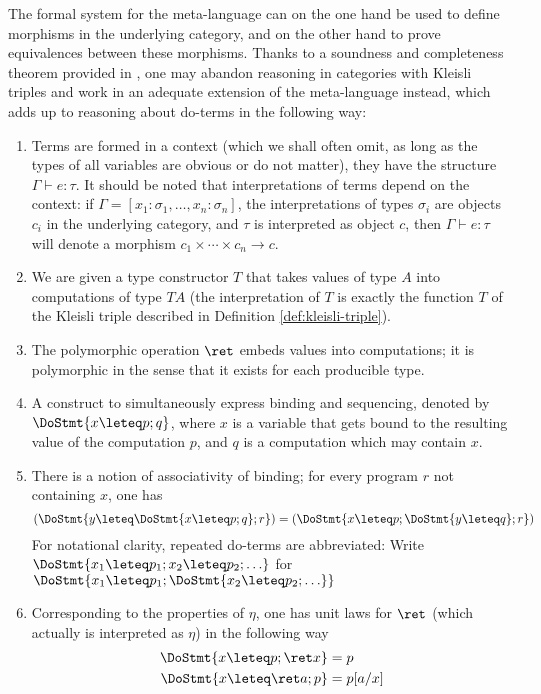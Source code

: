 The formal system for the meta-language can on the one hand be used to define
morphisms in the underlying category, and on the other hand to prove
equivalences between these morphisms. Thanks to a soundness and completeness
theorem provided in \cite{Moggi91}, one may abandon reasoning in categories with
Kleisli triples and work in an adequate extension of the meta-language instead,
which adds up to reasoning about do-terms in the following way:
\begin{enumerate}
\item Terms are formed in a context (which we shall often omit, as long as the
  types of all variables are obvious or do not matter), \IE they have the
  structure $\Gamma \vdash e : \tau$. It should be noted that interpretations of terms depend
  on the context: if $\Gamma = [x_1 : \sigma_1, \ldots, x_n : \sigma_n]$, the interpretations of
  types $\sigma_i$ are objects $c_i$ in the underlying category, and  $\tau$ is
  interpreted as object $c$, then $\Gamma \vdash e : \tau$ will denote a morphism $c_1 \times \cdots \times
  c_n \to c$.

\item We are given a type constructor $T$ that takes values of type $A$ into
  computations of type $T A$ (the interpretation of $T$ is exactly the function
  $T$ of the Kleisli triple described in Definition \ref{def:kleisli-triple}).
  
\item The polymorphic operation $\ret$ embeds values into computations; it is
  polymorphic in the sense that it exists for each producible type.
  
\item A construct to simultaneously express binding and sequencing, denoted by
  $\DoStmt{x\leteq p; q}$, where $x$ is a variable that gets bound to the
  resulting value of the computation $p$, and $q$ is a computation which may
  contain $x$.
  
\item There is a notion of associativity of binding; for every program $r$ not
  containing $x$, one has
  \[
  (\DoStmt{y\leteq \DoStmt{x\leteq p; q}; r}) = (\DoStmt{x\leteq p;
    \DoStmt{y\leteq q}; r})
  \]
  For notational clarity, repeated do-terms are abbreviated: Write $\DoStmt{x_1\leteq
    p_1; x_2\leteq p_2; \ldots}$ for $\DoStmt{x_1\leteq p_1; \DoStmt{x_2\leteq p_2; \ldots}}$
  
\item Corresponding to the properties of $\eta$, one has unit laws for $\ret$
  (which actually is interpreted as $\eta$) in the following way
  \begin{align*}
    \DoStmt{x\leteq p; \ret x} &= p \\
    \DoStmt{x\leteq \ret a; p} &= p[a/x] \\
  \end{align*}
  

\end{enumerate}
